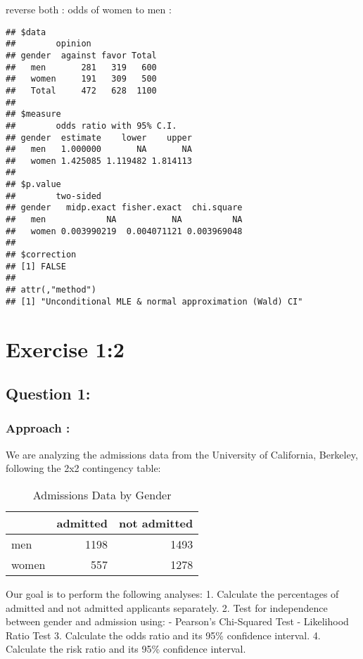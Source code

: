 \documentclass[
]{article}
\begin{document}
reverse both : odds of women to men :

\begin{verbatim}
## $data
##        opinion
## gender  against favor Total
##   men       281   319   600
##   women     191   309   500
##   Total     472   628  1100
## 
## $measure
##        odds ratio with 95% C.I.
## gender  estimate    lower    upper
##   men   1.000000       NA       NA
##   women 1.425085 1.119482 1.814113
## 
## $p.value
##        two-sided
## gender   midp.exact fisher.exact  chi.square
##   men            NA           NA          NA
##   women 0.003990219  0.004071121 0.003969048
## 
## $correction
## [1] FALSE
## 
## attr(,"method")
## [1] "Unconditional MLE & normal approximation (Wald) CI"
\end{verbatim}

\section{Exercise 1:2}\label{exercise-12}

\subsection{Question 1:}\label{question-1-1}

\subsubsection{Approach :}\label{approach-2}

We are analyzing the admissions data from the University of California,
Berkeley, following the 2x2 contingency table:

\begin{table}

\caption{\label{tab:unnamed-chunk-7}Admissions Data by Gender}
\centering
\begin{tabular}[t]{lrr}
\toprule
  & admitted & not admitted\\
\midrule
men & 1198 & 1493\\
women & 557 & 1278\\
\bottomrule
\end{tabular}
\end{table}

Our goal is to perform the following analyses: 1. Calculate the
percentages of admitted and not admitted applicants separately. 2. Test
for independence between gender and admission using: - Pearson's
Chi-Squared Test - Likelihood Ratio Test 3. Calculate the odds ratio and
its 95\% confidence interval. 4. Calculate the risk ratio and its 95\%
confidence interval.
\end{document}
